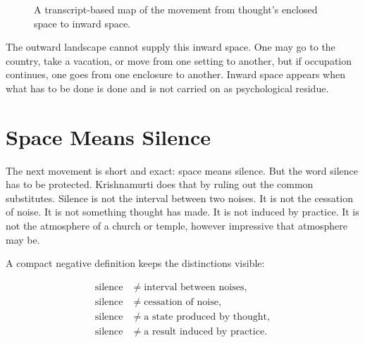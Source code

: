 \begin{figure}
\centering
{}
\caption{A transcript-based map of the movement from thought's enclosed space to inward space.}
\end{figure}

The outward landscape cannot supply this inward space. One may go to the country, take a vacation, or move from one setting to another, but if occupation continues, one goes from one enclosure to another. Inward space appears when what has to be done is done and is not carried on as psychological residue.

\section{Space Means Silence}

The next movement is short and exact: space means silence. But the word silence has to be protected. Krishnamurti does that by ruling out the common substitutes. Silence is not the interval between two noises. It is not the cessation of noise. It is not something thought has made. It is not induced by practice. It is not the atmosphere of a church or temple, however impressive that atmosphere may be.

A compact negative definition keeps the distinctions visible:

\begin{align}
\text{silence} &\neq \text{interval between noises}, \\
\text{silence} &\neq \text{cessation of noise}, \\
\text{silence} &\neq \text{a state produced by thought}, \\
\text{silence} &\neq \text{a result induced by practice}.
\end{align}


